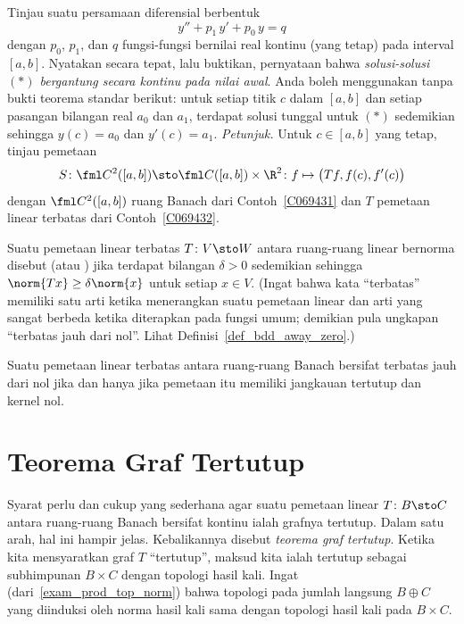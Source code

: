 \begin{exer} Tinjau suatu persamaan diferensial berbentuk
   \[ y'' + p_1\,y' + p_0\,y = q  \tag{$\ast$} \]
dengan $p_0$, $p_1$, dan $q$ fungsi-fungsi bernilai real kontinu (yang tetap) pada interval
$[a,b]$.  Nyatakan secara tepat, lalu buktikan, pernyataan bahwa \emph{solusi-solusi $(\ast)$
bergantung secara kontinu pada nilai awal}.  Anda boleh menggunakan tanpa bukti teorema standar berikut:
untuk setiap titik $c$ dalam $[a,b]$ dan setiap pasangan bilangan real $a_0$ dan $a_1$,
terdapat solusi tunggal untuk $(\ast)$ sedemikian sehingga $y(c) = a_0$ dan $y'(c) = a_1$.
\emph{Petunjuk.} Untuk $c \in [a,b]$ yang tetap, tinjau pemetaan
  \[ S\colon \fml C^2([a,b]) \sto \fml C([a,b]) \times \R^2 \colon
                                        f \mapsto \bigl(Tf,f(c),f'(c)\bigr) \]
dengan $\fml C^2([a,b])$ ruang Banach dari Contoh~\ref{C069431} dan $T$ pemetaan
linear terbatas dari Contoh~\ref{C069432}.
\end{exer}

\begin{defn} Suatu pemetaan linear terbatas $T\colon V \sto W$ antara ruang-ruang linear bernorma disebut
 (atau
) jika terdapat bilangan $\delta > 0$ sedemikian sehingga $\norm{Tx} \ge
\delta\norm{x}$ untuk setiap $x \in V$. (Ingat bahwa kata ``terbatas'' memiliki satu arti ketika
menerangkan suatu pemetaan linear dan arti yang sangat berbeda ketika diterapkan pada fungsi umum;
demikian pula ungkapan ``terbatas jauh dari nol''. Lihat Definisi~\ref{def_bdd_away_zero}.)
\end{defn}

\begin{prop} Suatu pemetaan linear terbatas antara ruang-ruang Banach bersifat terbatas jauh dari nol jika dan
hanya jika pemetaan itu memiliki jangkauan tertutup dan kernel nol.
\end{prop}


















\section{Teorema Graf Tertutup}
Syarat perlu dan cukup yang sederhana agar suatu pemetaan linear $T\colon B \sto C$ antara ruang-ruang Banach
bersifat kontinu ialah grafnya tertutup.  Dalam satu arah, hal ini hampir jelas.  Kebalikannya
disebut \emph{teorema graf tertutup}.  Ketika kita mensyaratkan graf $T$
``tertutup'', maksud kita ialah tertutup sebagai subhimpunan $B \times C$ dengan topologi hasil kali.  Ingat (dari~\ref{exam_prod_top_norm})
bahwa topologi pada jumlah langsung $B \oplus C$ yang diinduksi oleh norma hasil kali sama dengan topologi hasil kali pada $B \times C$.

